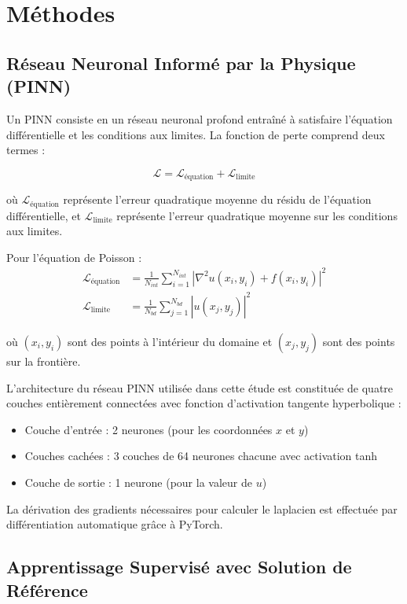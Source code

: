 \documentclass[11pt,a4paper]{article}
\begin{document}
\section{Méthodes}

\subsection{Réseau Neuronal Informé par la Physique (PINN)}

Un PINN consiste en un réseau neuronal profond entraîné à satisfaire l'équation différentielle et les conditions aux limites. La fonction de perte comprend deux termes :

\begin{equation}
\mathcal{L} = \mathcal{L}_\text{équation} + \mathcal{L}_\text{limite}
\end{equation}

où $\mathcal{L}_\text{équation}$ représente l'erreur quadratique moyenne du résidu de l'équation différentielle, et $\mathcal{L}_\text{limite}$ représente l'erreur quadratique moyenne sur les conditions aux limites.

Pour l'équation de Poisson :
\begin{align}
\mathcal{L}_\text{équation} &= \frac{1}{N_{int}} \sum_{i=1}^{N_{int}} \left| \nabla^2 u(x_i, y_i) + f(x_i, y_i) \right|^2 \\
\mathcal{L}_\text{limite} &= \frac{1}{N_{bd}} \sum_{j=1}^{N_{bd}} \left| u(x_j, y_j) \right|^2
\end{align}

où $(x_i, y_i)$ sont des points à l'intérieur du domaine et $(x_j, y_j)$ sont des points sur la frontière.

L'architecture du réseau PINN utilisée dans cette étude est constituée de quatre couches entièrement connectées avec fonction d'activation tangente hyperbolique :
\begin{itemize}
    \item Couche d'entrée : 2 neurones (pour les coordonnées $x$ et $y$)
    \item Couches cachées : 3 couches de 64 neurones chacune avec activation tanh
    \item Couche de sortie : 1 neurone (pour la valeur de $u$)
\end{itemize}

La dérivation des gradients nécessaires pour calculer le laplacien est effectuée par différentiation automatique grâce à PyTorch.

\subsection{Apprentissage Supervisé avec Solution de Référence}
\end{document}
